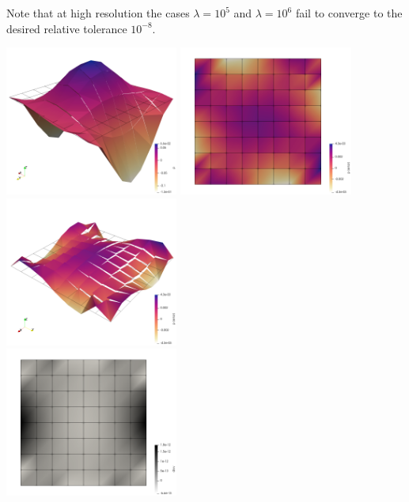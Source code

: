 Note that at high resolution the cases $\lambda=10^{5}$ and $\lambda=10^6$ fail 
to converge to the desired relative tolerance $10^{-8}$. 

\begin{center}
\includegraphics[width=5.7cm]{python_codes/fieldstone_161/results/bench2/press}
\includegraphics[width=5.7cm]{python_codes/fieldstone_161/results/bench2/press_error}
\includegraphics[width=5.7cm]{python_codes/fieldstone_161/results/bench2/press_error2}\\
\includegraphics[width=5.7cm]{python_codes/fieldstone_161/results/bench2/divv}

\end{center}
